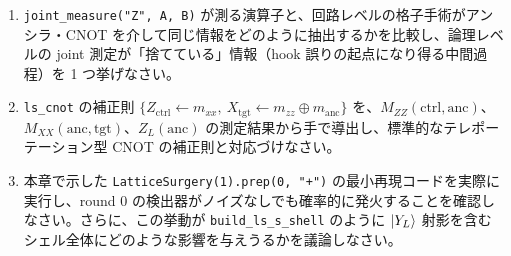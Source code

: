 \begin{exercise}
  \begin{enumerate}
    \item \texttt{joint\_measure("Z", A, B)} が測る演算子と、回路レベルの格子手術がアンシラ・CNOT を介して同じ情報をどのように抽出するかを比較し、論理レベルの joint 測定が「捨てている」情報（hook 誤りの起点になり得る中間過程）を 1 つ挙げなさい。
    \item \texttt{ls\_cnot} の補正則 $\{Z_{\mathrm{ctrl}}\!\leftarrow\! m_{xx},\ X_{\mathrm{tgt}}\!\leftarrow\! m_{zz}\oplus m_{\mathrm{anc}}\}$ を、$M_{ZZ}(\mathrm{ctrl},\mathrm{anc})$、$M_{XX}(\mathrm{anc},\mathrm{tgt})$、$Z_L(\mathrm{anc})$ の測定結果から手で導出し、標準的なテレポーテーション型 CNOT の補正則と対応づけなさい。
    \item 本章で示した \texttt{LatticeSurgery(1).prep(0, "+")} の最小再現コードを実際に実行し、round 0 の検出器がノイズなしでも確率的に発火することを確認しなさい。さらに、この挙動が \texttt{build\_ls\_s\_shell} のように $\ket{Y_L}$ 射影を含むシェル全体にどのような影響を与えうるかを議論しなさい。
  \end{enumerate}
\end{exercise}
